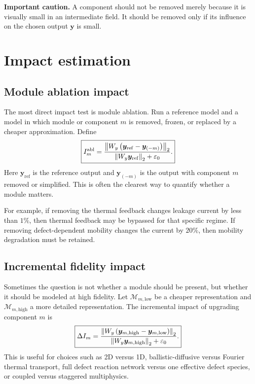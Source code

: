 \documentclass[11pt]{article}
\begin{document}
\begin{notebox}
\textbf{Important caution.} A component should not be removed merely because it is visually small in an intermediate field. It should be removed only if its influence on the chosen output \(\bm{y}\) is small.
\end{notebox}

\section{Impact estimation}
\subsection{Module ablation impact}
The most direct impact test is module ablation. Run a reference model and a model in which module or component \(m\) is removed, frozen, or replaced by a cheaper approximation. Define
\begin{equation}
    \boxed{
    I_m^{\mathrm{abl}}
    =
    \frac{\norm{W_y\left(\bm{y}_{\mathrm{ref}}-\bm{y}_{(-m)}\right)}_2}
    {\norm{W_y\bm{y}_{\mathrm{ref}}}_2+\varepsilon_0}.
    }
    \label{eq:ablation_impact}
\end{equation}
Here \(\bm{y}_{\mathrm{ref}}\) is the reference output and \(\bm{y}_{(-m)}\) is the output with component \(m\) removed or simplified. This is often the clearest way to quantify whether a module matters.

For example, if removing the thermal feedback changes leakage current by less than \(1\%\), then thermal feedback may be bypassed for that specific regime. If removing defect-dependent mobility changes the current by \(20\%\), then mobility degradation must be retained.

\subsection{Incremental fidelity impact}
Sometimes the question is not whether a module should be present, but whether it should be modeled at high fidelity. Let \(\mathcal{M}_{m,\mathrm{low}}\) be a cheaper representation and \(\mathcal{M}_{m,\mathrm{high}}\) a more detailed representation. The incremental impact of upgrading component \(m\) is
\begin{equation}
    \boxed{
    \Delta I_m
    =
    \frac{\norm{W_y\left(\bm{y}_{m,\mathrm{high}}-\bm{y}_{m,\mathrm{low}}\right)}_2}
    {\norm{W_y\bm{y}_{m,\mathrm{high}}}_2+\varepsilon_0}.
    }
    \label{eq:incremental_impact}
\end{equation}
This is useful for choices such as 2D versus 1D, ballistic-diffusive versus Fourier thermal transport, full defect reaction network versus one effective defect species, or coupled versus staggered multiphysics.
\end{document}
